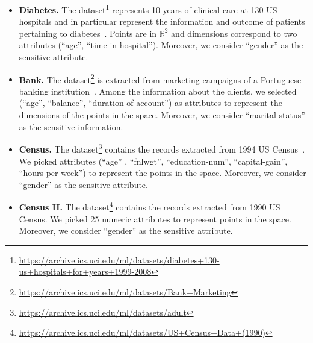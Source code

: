 \begin{itemize}
\item{\bf Diabetes.} The dataset\footnote{\href{https://archive.ics.uci.edu/ml/datasets/diabetes+130-us+hospitals+for+years+1999-2008}{https://archive.ics.uci.edu/ml/datasets/diabetes+130-us+hospitals+for+years+1999-2008}} represents 10 years of clinical care at 130 US hospitals and in particular represent the information and outcome of patients pertaining to diabetes~\citep{strack2014impact}. Points are in $\mathbb{R}^2$ and dimensions correspond to two attributes (``age'', ``time-in-hospital''). Moreover, we consider ``gender'' as the sensitive attribute.  
\item{\bf Bank.} The dataset\footnote{\href{https://archive.ics.uci.edu/ml/datasets/Bank+Marketing}{https://archive.ics.uci.edu/ml/datasets/Bank+Marketing}} is extracted from marketing campaigns of a Portuguese banking institution~\citep{moro2014data}. Among the information about the clients, we selected (``age'', ``balance'', ``duration-of-account'') as attributes to represent the dimensions of the points in the space. Moreover, we consider ``marital-status'' as the sensitive information.   
\item{\bf Census.} The dataset\footnote{\href{https://archive.ics.uci.edu/ml/datasets/adult}{https://archive.ics.uci.edu/ml/datasets/adult}} contains the records extracted from 1994 US Census~\citep{kohavi1996scaling}. We picked attributes (``age'' , ``fnlwgt'', ``education-num'', ``capital-gain'', ``hours-per-week'') to represent the points in the space. Moreover, we consider ``gender'' as the sensitive attribute. 
\item{\bf Census II.} The dataset\footnote{\href{https://archive.ics.uci.edu/ml/datasets/US+Census+Data+(1990)}{https://archive.ics.uci.edu/ml/datasets/US+Census+Data+(1990)}} contains the records extracted from 1990 US Census. We picked 25  numeric attributes to represent points in the space. Moreover, we consider ``gender'' as the sensitive attribute. 
\end{itemize} 

\begin{table}[!h]
\centering
{}
\caption{The description of the three datasets used in our empirical evaluation. In each dataset, the goal is find a fair $k$-median with respect to the sensitive attribute.}
\label{table:dataset-description-1}
\end{table}

